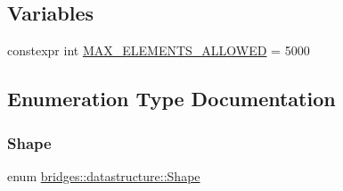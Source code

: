 \subsection*{Variables}
\begin{DoxyCompactItemize}
\item 
constexpr int \mbox{\hyperlink{namespacebridges_1_1datastructure_a2e75baaa66b6c9cd3f5c5f598b2c8147}{M\+A\+X\+\_\+\+E\+L\+E\+M\+E\+N\+T\+S\+\_\+\+A\+L\+L\+O\+W\+ED}} = 5000
\end{DoxyCompactItemize}


\subsection{Enumeration Type Documentation}
\mbox{\label{namespacebridges_1_1datastructure_a3408f5f44d9c6062e5f3adb7e1bbb7f0}} 
\subsubsection{\texorpdfstring{Shape}{Shape}}
{\footnotesize\ttfamily enum \mbox{\hyperlink{namespacebridges_1_1datastructure_a3408f5f44d9c6062e5f3adb7e1bbb7f0}{bridges\+::datastructure\+::\+Shape}}}

